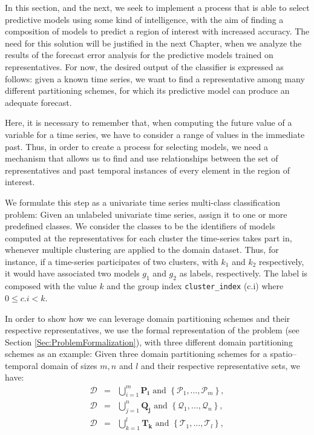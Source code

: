 In this section, and the next, we seek to implement a process that is able to select predictive models using some kind of intelligence, with the aim of finding a composition of models to predict a region of interest with increased accuracy. The need for this solution will be justified in the next Chapter, when we analyze the results of the forecast error analysis for the predictive models trained on representatives. For now, the desired output of the classifier is expressed as follows: given a known time series, we want to find a representative among many different partitioning schemes, for which its predictive model can produce an adequate forecast.

Here, it is necessary to remember that, when computing the future value of a variable for a time series, we have to consider a range of values in the immediate past\cite{Chatfield2001}. Thus, in order to create a process for selecting models, we need a mechanism that allows us to find and use relationships between the set of representatives and past temporal instances of every element in the region of interest.

We formulate this step as a univariate time series multi-class classification problem: Given an unlabeled univariate time series, assign it to one or more predefined classes. We consider the classes to be the identifiers of models computed at the representatives for each cluster the time-series takes part in, whenever multiple clustering are applied to the domain dataset. Thus, for instance, if a time-series participates of two clusters, with $k_1$ and $k_2$ respectively, it would have associated two models $g_1$ and $g_2$ as labels, respectively.
The label is composed with the value $k$ and the group index \texttt{cluster\_index} (c.i) where $0 \leq c.i <k$. 

In order to show how we can leverage domain partitioning schemes and their respective representatives, we use the formal representation of the problem (see Section \ref{Sec:ProblemFormalization}), with three different domain partitioning schemes as an example: Given three domain partitioning schemes for a spatio--temporal domain of sizes $m, n$ and $l$ and their respective representative sets, we have:
\begin{eqnarray} 
\nonumber
\mathcal{D}	& = & \bigcup_{i=1}^{m} \mathbf{P_i} \,\,\textrm{and} \,\, \left\{\mathcal{P}_{1}, \ldots, \mathcal{P}_{m}\right\},  \\ \nonumber
\mathcal{D} & = & \bigcup_{j=1}^{n} \mathbf{Q_j} \,\,\textrm{and} \,\, \left\{\mathcal{Q}_{1}, \ldots, \mathcal{Q}_{n}\right\}, \\ \nonumber 
\mathcal{D} & = & \bigcup_{k=1}^{l} \mathbf{T_k} \,\,\textrm{and} \,\, \left\{\mathcal{T}_{1}, \ldots, \mathcal{T}_{l}\right\},
\end{eqnarray}

